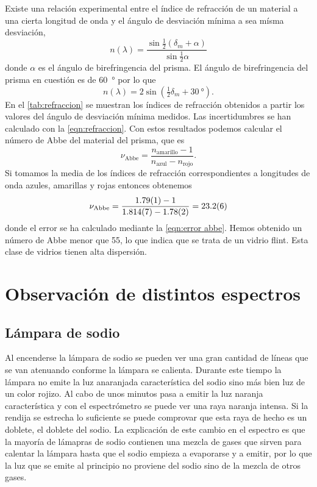 \documentclass[12pt]{article}
\numberwithin{table}{section}
\numberwithin{figure}{section}
\numberwithin{equation}{section}
\begin{document}
Existe una relación experimental entre el índice de refracción de un material a una cierta longitud de onda y el ángulo de desviación mínima a sea mísma desviación,
\begin{equation} \label{eqn:dispersión}
	n(\lambda) = \frac{\sin{\tfrac{1}{2}(\delta_m + \alpha)}}{\sin{\tfrac{1}{2}\alpha}}
\end{equation}
donde \( \alpha \) es el ángulo de birefringencia del prisma. El ángulo de birefringencia del prisma en cuestión es de \SI{60}{\degree} por lo que
\begin{equation*}
	n(\lambda) = 2 \sin{\left(\tfrac{1}{2}\delta_m + \SI{30}{\degree}\right)}.
\end{equation*}
En el \cref{tab:refraccion} se muestran los índices de refracción obtenidos a partir los valores del ángulo de desviación mínima medidos. Las incertidumbres se han calculado con la \cref{eqn:refraccion}. Con estos resultados podemos calcular el número de Abbe del material del prisma, que es
\begin{equation*}
	\nu_\text{Abbe} = \frac{n_\text{amarillo} - 1}{n_\text{azul} - n_\text{rojo}}.
\end{equation*}
Si tomamos la media de los índices de refracción correspondientes a longitudes de onda azules, amarillas y rojas entonces obtenemos
\begin{equation*}
	\nu_\text{Abbe} = \frac{\num{1.79 \pm 0.01} - 1}{\num{1.814 \pm 0.007} - \num{1.78 \pm 0.02}} = \num{23.2\pm 0.6}
\end{equation*}
donde el error se ha calculado mediante la \cref{eqn:error abbe}. Hemos obtenido un número de Abbe menor que 55, lo que indica que se trata de un vidrio flint. Esta clase de vidrios tienen alta dispersión.

\section{Observación de distintos espectros}
\subsection{Lámpara de sodio}
Al encenderse la lámpara de sodio se pueden ver una gran cantidad de líneas que se van atenuando conforme la lámpara se calienta. Durante este tiempo la lámpara no emite la luz anaranjada característica del sodio sino más bien luz de un color rojizo. Al cabo de unos minutos pasa a emitir la luz naranja característica y con el espectrómetro se puede ver una raya naranja intensa. Si la rendija se estrecha lo suficiente se puede comprovar que esta raya de hecho es un doblete, el doblete del sodio. La explicación de este cambio en el espectro es que la mayoría de lámapras de sodio contienen una mezcla de gases que sirven para calentar la lámpara hasta que el sodio empieza a evaporarse y a emitir, por lo que la luz que se emite al principio no proviene del sodio sino de la mezcla de otros gases.  
\end{document}
